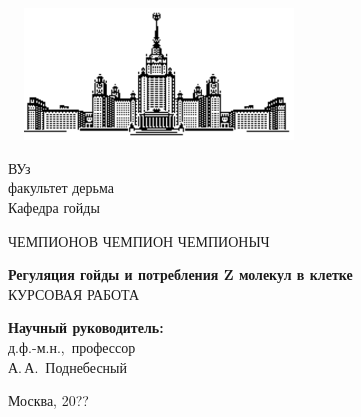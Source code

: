 \begin{titlepage}
\begin{center}
\includegraphics[width=8cm, height=3.5cm]{pic/msu.eps}
\end{center}
\begin{center}
ВУз\\
\vspace{0.1 cm}
факультет дерьма\\
\vspace{0.1 cm}
Кафедра гойды

\vspace{3cm}
{\Large ЧЕМПИОНОВ ЧЕМПИОН ЧЕМПИОНЫЧ }\\
\vspace{1cm}

{\bf\LARGE Регуляция гойды и потребления Z молекул в клетке}\\ \vspace{2cm}
КУРСОВАЯ РАБОТА

\end{center}
\vspace{2cm}
\begin{flushright}

{\bf Научный руководитель:}\\
д.ф.-м.н.,~профессор\\ 
А.\,А.~Поднебесный

\end{flushright}

\hfill

\centerline {Москва, 20??}

\end{titlepage}
